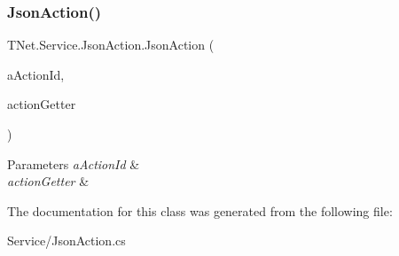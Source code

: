 \subsubsection{\texorpdfstring{Json\+Action()}{JsonAction()}}
{\footnotesize\ttfamily T\+Net.\+Service.\+Json\+Action.\+Json\+Action (\begin{DoxyParamCaption}\item[{int}]{a\+Action\+Id,  }\item[{\mbox{\hyperlink{class_t_net_1_1_service_1_1_action_getter}{Action\+Getter}}}]{action\+Getter }\end{DoxyParamCaption})\hspace{0.3cm}{\ttfamily [protected]}}






\begin{DoxyParams}{Parameters}
{\em a\+Action\+Id} & \\
\hline
{\em action\+Getter} & \\
\hline
\end{DoxyParams}


The documentation for this class was generated from the following file\+:\begin{DoxyCompactItemize}
\item 
Service/Json\+Action.\+cs\end{DoxyCompactItemize}
